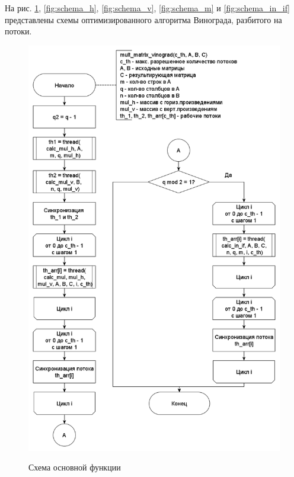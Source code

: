\documentclass[a4paper,14pt]{article}
\begin{document}
	На рис. \ref{fig:schema_main}, \ref{fig:schema_h}, \ref{fig:schema_v}, \ref{fig:schema_m} и \ref{fig:schema_in_if} представлены схемы оптимизированного алгоритма Винограда, разбитого на потоки.
	    \begin{figure}[h!]
	    	\begin{center}
	    		{\includegraphics[scale = 0.5]{threaded_winograd.png}}
	    		\caption{Схема основной функции}
	    		\label{fig:schema_main}
	    	\end{center}
	    \end{figure}
	    
\end{document}
